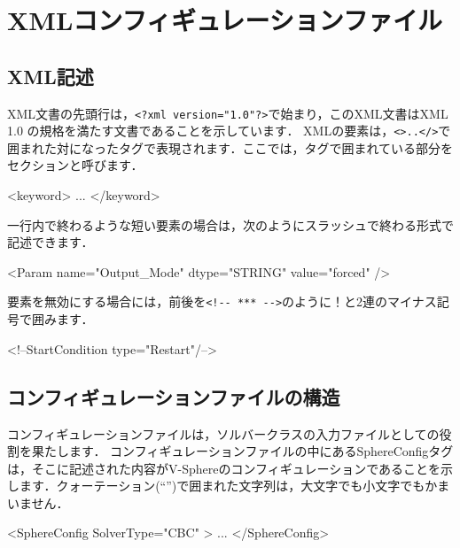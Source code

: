 \graphicspath{{./fig_Param/}}

%
\section{XMLコンフィギュレーションファイル}
%
\subsection{XML記述}
XML文書の先頭行は，\verb|<?xml version="1.0"?>|で始まり，このXML文書はXML 1.0 の規格を満たす文書であることを示しています．
XMLの要素は，\verb|<>..</>|で囲まれた対になったタグで表現されます．ここでは，タグで囲まれている部分をセクションと呼びます．
{
\small 
\begin{program}
<keyword>
	...
</keyword>
\end{program}
}


\noindent 一行内で終わるような短い要素の場合は，次のようにスラッシュで終わる形式で記述できます．
\vspace{2mm}

{
\small 
\begin{program}
<Param name="Output_Mode" dtype="STRING" value="forced" />
\end{program}
}

\noindent 要素を無効にする場合には，前後を\verb|<!-- *** -->|のように！と2連のマイナス記号で囲みます．
\vspace{2mm}

{
\small 
\begin{program}
<!--StartCondition type="Restart"/-->
\end{program}
}


%
\subsection{コンフィギュレーションファイルの構造}
コンフィギュレーションファイルは，ソルバークラスの入力ファイルとしての役割を果たします．
コンフィギュレーションファイルの中にあるSphereConfigタグは，そこに記述された内容がV-Sphereのコンフィギュレーションであることを示します．クォーテーション(“”)で囲まれた文字列は，大文字でも小文字でもかまいません．

{
\small 
\begin{program}
<SphereConfig SolverType="CBC" >
	...
</SphereConfig>
\end{program}
}

